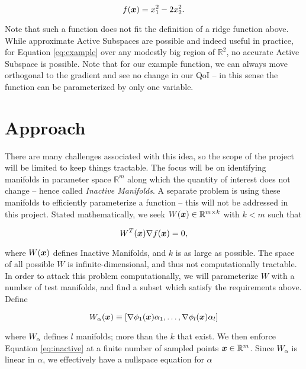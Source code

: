 \documentclass{article}
\begin{document}
\begin{equation}
f(\boldsymbol{x}) = x_1^2 - 2x_2^2. \label{eq:example}
\end{equation}

Note that such a function does not fit the definition of a ridge function above. While approximate Active Subspaces are possible and indeed useful in practice, for Equation \ref{eq:example} over any modestly big region of $\mathbb{R}^2$, no accurate Active Subspace is possible. Note that for our example function, we can always move orthogonal to the gradient and see no change in our QoI -- in this sense the function can be parameterized by only one variable.

\section{Approach}
There are many challenges associated with this idea, so the scope of the project will be limited to keep things tractable. The focus will be on identifying manifolds in parameter space $\mathbb{R}^m$ along which the quantity of interest does not change -- hence called \emph{Inactive Manifolds}. A separate problem is using these manifolds to efficiently parameterize a function -- this will not be addressed in this project. Stated mathematically, we seek $W(\boldsymbol{x})\in\mathbb{R}^{m\times k}$ with $k < m$ such that

\begin{equation}
W^T(\boldsymbol{x})\nabla f(\boldsymbol{x}) = 0, \label{eq:inactive}
\end{equation}

where $W(\boldsymbol{x})$ defines Inactive Manifolds, and $k$ is as large as possible. The space of all possible $W$ is infinite-dimensional, and thus not computationally tractable. In order to attack this problem computationally, we will parameterize $W$ with a number of test manifolds, and find a subset which satisfy the requirements above. Define

\begin{equation}
W_{\alpha}(\boldsymbol{x}) \equiv [\nabla\phi_1(\boldsymbol{x})\alpha_1,\dots,\nabla\phi_l(\boldsymbol{x})\alpha_l]
\end{equation}

where $W_{\alpha}$ defines $l$ manifolds; more than the $k$ that exist. We then enforce Equation \ref{eq:inactive} at a finite number of sampled points $\boldsymbol{x}\in\mathbb{R}^m$. Since $W_{\alpha}$ is linear in $\alpha$, we effectively have a nullspace equation for $\alpha$
\end{document}
